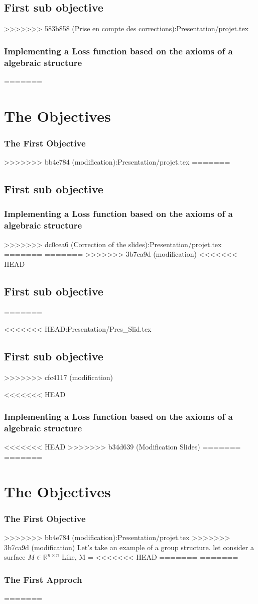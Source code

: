 \documentclass{beamer}
\begin{document}
\subsection{First sub objective}
>>>>>>> 583b858 (Prise en compte des corrections):Presentation/projet.tex
\begin{frame}
    \frametitle{Implementing a Loss function based on the axioms of a
    algebraic structure}
=======
\section{The Objectives}
\begin{frame}
        \frametitle{The First Objective}
>>>>>>> bb4e784 (modification):Presentation/projet.tex
=======
\subsection{First sub objective} 
\begin{frame}
    \frametitle{Implementing a Loss function based on the axioms of a
    algebraic structure}
>>>>>>> dc0cea6 (Correction of the slides):Presentation/projet.tex
=======
=======
>>>>>>> 3b7ca9d (modification)
<<<<<<< HEAD
\subsection{First sub objective}
=======

<<<<<<< HEAD:Presentation/Pres_Slid.tex
\subsection{First sub objective} 
>>>>>>> cfc4117 (modification)
\begin{frame}
<<<<<<< HEAD
    \frametitle{Implementing a Loss function based on the axioms of a
    algebraic structure}
<<<<<<< HEAD
>>>>>>> b34d639 (Modification Slides)
=======
=======
\section{The Objectives}
\begin{frame}
        \frametitle{The First Objective}
>>>>>>> bb4e784 (modification):Presentation/projet.tex
>>>>>>> 3b7ca9d (modification)
    Let's take an example of a group structure.
    let consider a surface $M \in \mathbb{R}^{n \times n}$
    Like,
    M =
<<<<<<< HEAD
=======
=======
        \frametitle{The First Approch}
=======


\end{frame}
\end{frame}
\end{frame}
\end{frame}
\end{frame}
\end{document}
